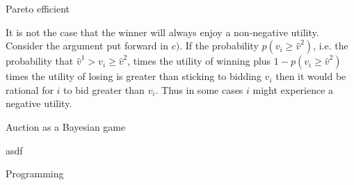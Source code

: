\documentclass[12pt]{article}
\newenvironment{question}[2][Question]{\begin{trivlist}
\item[\hskip \labelsep {\bfseries #1}\hskip \labelsep {\bfseries #2.}]}{\end{trivlist}}
\newenvironment{answer}[2][Answer]{\begin{trivlist}
\item[\hskip \labelsep {\bfseries #1}\hskip \labelsep {\bfseries #2:}]}{\end{trivlist}}
\begin{document}
\begin{answer}{d)}{Pareto efficient}

It is not the case that the winner will always enjoy a non-negative utility. Consider the argument put forward in $c)$. If the probability $p(v_i\geq\hat{v}^2)$, i.e. the probability that $\hat{v}^1 > v_i \geq \hat{v}^2$, times the utility of winning plus $1-p(v_i\geq\hat{v}^2)$ times the utility of losing is greater than sticking to bidding $v_i$ then it would be rational for $i$ to bid greater than $v_i$. Thus in some cases $i$ might experience a negative utility.
\end{answer}

\begin{question}{2}
Auction as a Bayesian game
\end{question}
\begin{answer}{a)}

asdf
\end{answer}

\begin{question}{4}
Programming
\end{question}
\begin{answer}{a)}

\end{answer}
\end{document}
